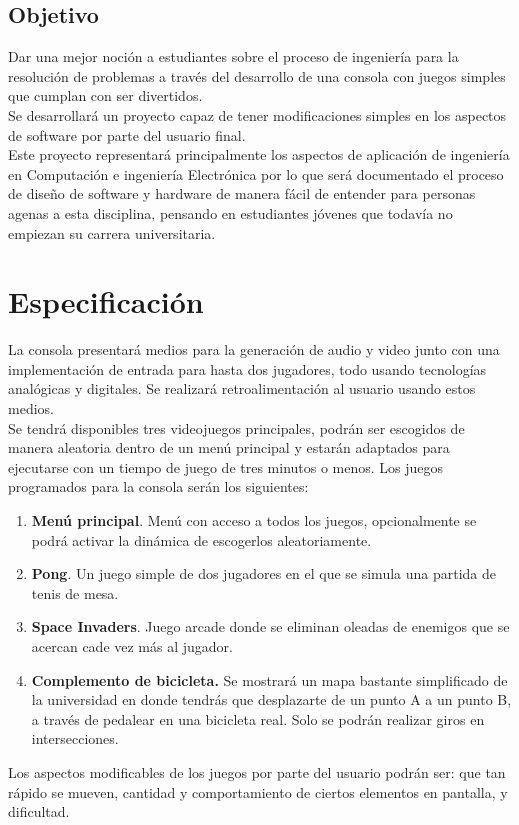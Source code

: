 \documentclass[letterpaper]{article}
\begin{document}
\begin{multicols}{2}
\subsection{Objetivo}
Dar una mejor noción a estudiantes sobre el proceso de ingeniería para la
resolución de problemas a través del desarrollo de una consola con juegos
simples que cumplan con ser divertidos.\\
Se desarrollará un proyecto capaz de tener modificaciones simples en los
aspectos de software por parte del usuario final.\\
Este proyecto representará principalmente los aspectos de aplicación de
ingeniería en Computación e ingeniería Electrónica por lo que será documentado
el proceso de diseño de software y hardware de manera fácil de entender para
personas agenas a esta disciplina, pensando en estudiantes jóvenes que todavía
no empiezan su carrera universitaria.

\section{Especificación}
La consola presentará medios para la generación de audio y video junto con
una implementación de entrada para hasta dos jugadores, todo usando
tecnologías analógicas y digitales. Se realizará retroalimentación al usuario
usando estos medios.\\
Se tendrá disponibles tres videojuegos principales, podrán ser escogidos de
manera aleatoria dentro de un menú principal y estarán adaptados para
ejecutarse con un tiempo de juego de tres minutos o menos. Los juegos
programados para la consola serán los siguientes:
\begin{enumerate}
    \item \textbf{Menú principal}. Menú con acceso a todos los juegos,
        opcionalmente se podrá activar la dinámica de escogerlos
        aleatoriamente.
    \item \textbf{Pong}. Un juego simple de dos jugadores en el que se simula
        una partida de tenis de mesa.
    \item \textbf{Space Invaders}. Juego arcade donde se eliminan oleadas de
        enemigos que se acercan cade vez más al jugador.
    \item \textbf{Complemento de bicicleta.} Se mostrará un mapa bastante
        simplificado de la universidad en donde tendrás que desplazarte de un
        punto A a un punto B, a través de pedalear en una bicicleta real. Solo
        se podrán realizar giros en intersecciones.
\end{enumerate}
Los aspectos modificables de los juegos por parte del usuario podrán ser: 
que tan rápido se mueven, cantidad y comportamiento de ciertos elementos en
pantalla, y dificultad.


\end{multicols}
\end{document}
